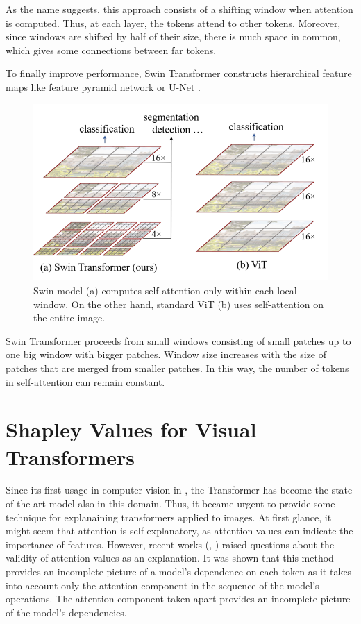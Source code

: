 \documentclass[magisterska,en]{pracamgr}
\begin{document}
As the name suggests, this approach consists of a shifting window when attention is computed. Thus, at each layer, the tokens attend to other tokens. Moreover, since windows are shifted by half of their size, there is much space in common, which gives some connections between far tokens.

To finally improve performance, Swin Transformer constructs hierarchical feature maps like feature pyramid network \cite{DBLP:conf/cvpr/LinDGHHB17} or U-Net \cite{DBLP:conf/miccai/RonnebergerFB15}.

\begin{figure}[H]
\centering
\includegraphics[scale=0.3]{./images/Swin_window.png}
\caption{Swin model (a) computes self-attention only within each local window. On the other hand, standard ViT (b) uses self-attention on the entire image.}
\end{figure}

Swin Transformer proceeds from small windows consisting of small patches up to one big window with bigger patches. Window size increases with the size of patches that are merged from smaller patches. In this way, the number of tokens in self-attention can remain constant.







\chapter{Shapley Values for Visual Transformers}\label{r:visual_shap}
Since its first usage in computer vision in
\cite{DBLP:conf/iclr/DosovitskiyB0WZ21}, the Transformer has become the state-of-the-art model also in this domain. Thus, it became urgent to provide some technique for explanaining transformers applied to images. At first glance, it might seem that attention is self-explanatory, as attention values can indicate the importance of features. However, recent works (\cite{DBLP:conf/acl/SerranoS19},
\cite{DBLP:conf/cvpr/CheferGW21}) raised questions about the validity of attention values as an explanation. It was shown that this method provides an incomplete picture of a model's dependence on each token as it takes into account only the attention component in the sequence of the model's operations. The attention component taken apart provides an incomplete picture of the model's dependencies.
\end{document}
